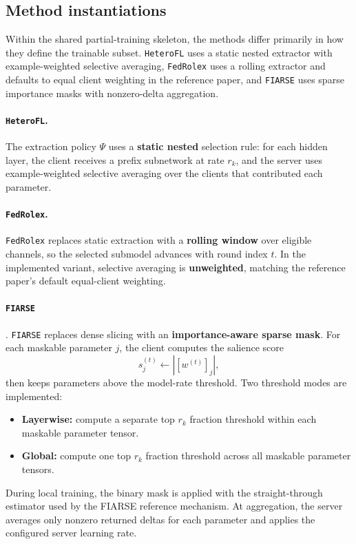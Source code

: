 \subsection{Method instantiations}

Within the shared partial-training skeleton, the methods differ primarily in how they define the trainable subset. \textcolor{heteroflblue}{\texttt{HeteroFL}} uses a static nested extractor with example-weighted selective averaging, \textcolor{fedrolexpurple}{\texttt{FedRolex}} uses a rolling extractor and defaults to equal client weighting in the reference paper, and \textcolor{fiarsered}{\texttt{FIARSE}} uses sparse importance masks with nonzero-delta aggregation.

\paragraph{\textcolor{heteroflblue}{\texttt{HeteroFL}}.}
The extraction policy $\Psi$ uses a \textbf{static nested} selection rule: for each hidden layer, the client receives a prefix subnetwork at rate $r_k$, and the server uses example-weighted selective averaging over the clients that contributed each parameter.

\paragraph{\textcolor{fedrolexpurple}{\texttt{FedRolex}}.}
\texttt{FedRolex} replaces static extraction with a \textbf{rolling window} over eligible channels, so the selected submodel advances with round index $t$. In the implemented variant, selective averaging is \textbf{unweighted}, matching the reference paper's default equal-client weighting.

\paragraph{\textcolor{fiarsered}{\texttt{FIARSE}}}.
\texttt{FIARSE} replaces dense slicing with an \textbf{importance-aware sparse mask}. For each maskable parameter \(j\), the client computes the salience score
\[
    s_j^{(t)} \gets |[w^{(t)}]_j|,
\]
then keeps parameters above the model-rate threshold. Two threshold modes are implemented:
\begin{itemize}[topsep=4pt, itemsep=4pt]
    \item \textbf{Layerwise:} compute a separate top \(r_k\) fraction threshold within each maskable parameter tensor.
    \item \textbf{Global:} compute one top \(r_k\) fraction threshold across all maskable parameter tensors.
\end{itemize}
During local training, the binary mask is applied with the straight-through estimator used by the FIARSE reference mechanism. At aggregation, the server averages only nonzero returned deltas for each parameter and applies the configured server learning rate.

